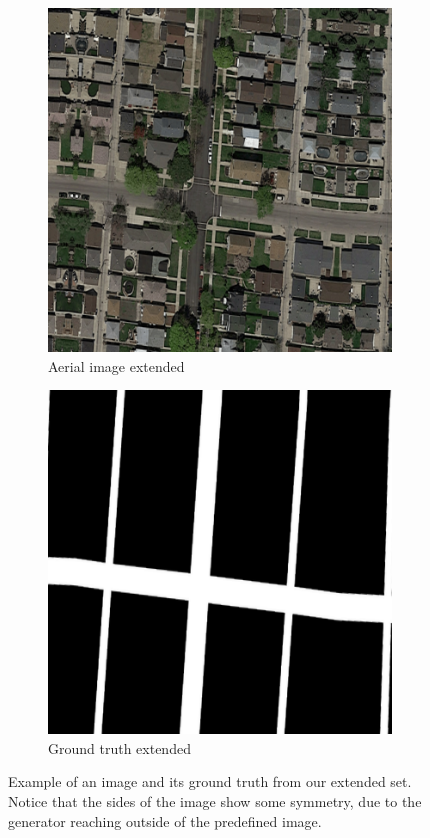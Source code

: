 \documentclass[10pt,conference,a4paper]{IEEEtran}
\begin{document}
\begin{figure}[ht]
  \begin{subfigure}[b]{0.2\textwidth}
    \includegraphics[width=\textwidth]{project2/report/images/satImage_001_0_1476.png}
    \caption{Aerial image extended}
    \label{fig:aerial_extended}
  \end{subfigure}
  \begin{subfigure}[b]{0.2\textwidth}
    \includegraphics[width=\textwidth]{project2/report/images/groudtruth_extended.png}
    \caption{Ground truth extended}
    \label{fig:gt_extended}
  \end{subfigure}
  \centering
  \caption{Example of an image and its ground truth from our extended set. Notice that the sides of the image show some symmetry, due to the generator reaching outside of the predefined image.}
  \label{fig:ext}
\end{figure}
\end{document}

